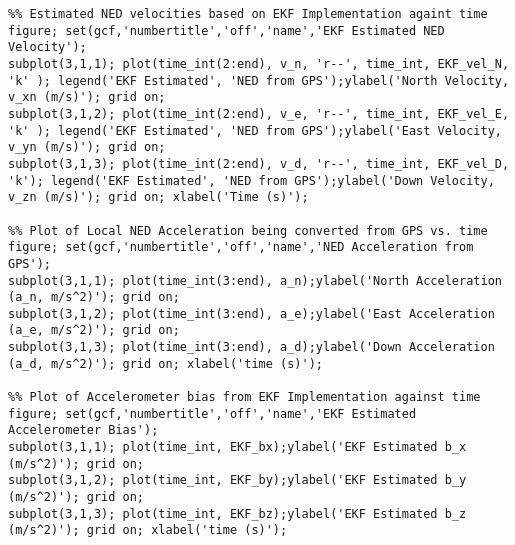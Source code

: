 \begin{lstlisting}
%% Estimated NED velocities based on EKF Implementation againt time
figure; set(gcf,'numbertitle','off','name','EKF Estimated NED Velocity');  
subplot(3,1,1); plot(time_int(2:end), v_n, 'r--', time_int, EKF_vel_N, 'k' ); legend('EKF Estimated', 'NED from GPS');ylabel('North Velocity, v_xn (m/s)'); grid on;
subplot(3,1,2); plot(time_int(2:end), v_e, 'r--', time_int, EKF_vel_E, 'k' ); legend('EKF Estimated', 'NED from GPS');ylabel('East Velocity, v_yn (m/s)'); grid on;
subplot(3,1,3); plot(time_int(2:end), v_d, 'r--', time_int, EKF_vel_D, 'k'); legend('EKF Estimated', 'NED from GPS');ylabel('Down Velocity, v_zn (m/s)'); grid on; xlabel('Time (s)');

%% Plot of Local NED Acceleration being converted from GPS vs. time
figure; set(gcf,'numbertitle','off','name','NED Acceleration from GPS');  
subplot(3,1,1); plot(time_int(3:end), a_n);ylabel('North Acceleration (a_n, m/s^2)'); grid on;
subplot(3,1,2); plot(time_int(3:end), a_e);ylabel('East Acceleration (a_e, m/s^2)'); grid on;
subplot(3,1,3); plot(time_int(3:end), a_d);ylabel('Down Acceleration (a_d, m/s^2)'); grid on; xlabel('time (s)');

%% Plot of Accelerometer bias from EKF Implementation against time
figure; set(gcf,'numbertitle','off','name','EKF Estimated Accelerometer Bias');  
subplot(3,1,1); plot(time_int, EKF_bx);ylabel('EKF Estimated b_x (m/s^2)'); grid on;
subplot(3,1,2); plot(time_int, EKF_by);ylabel('EKF Estimated b_y (m/s^2)'); grid on;
subplot(3,1,3); plot(time_int, EKF_bz);ylabel('EKF Estimated b_z (m/s^2)'); grid on; xlabel('time (s)');
\end{lstlisting}
\label{fig:EKF2NED}
